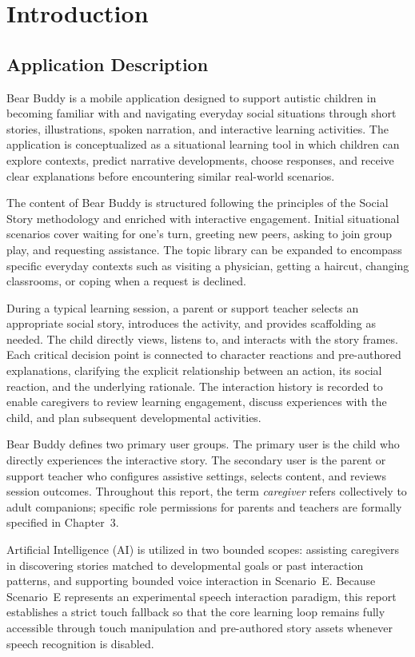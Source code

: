\chapter{Introduction}

\section{Application Description}

Bear Buddy is a mobile application designed to support autistic children in becoming familiar with and navigating everyday social situations through short stories, illustrations, spoken narration, and interactive learning activities. The application is conceptualized as a situational learning tool in which children can explore contexts, predict narrative developments, choose responses, and receive clear explanations before encountering similar real-world scenarios.

The content of Bear Buddy is structured following the principles of the Social Story methodology and enriched with interactive engagement. Initial situational scenarios cover waiting for one's turn, greeting new peers, asking to join group play, and requesting assistance. The topic library can be expanded to encompass specific everyday contexts such as visiting a physician, getting a haircut, changing classrooms, or coping when a request is declined.

During a typical learning session, a parent or support teacher selects an appropriate social story, introduces the activity, and provides scaffolding as needed. The child directly views, listens to, and interacts with the story frames. Each critical decision point is connected to character reactions and pre-authored explanations, clarifying the explicit relationship between an action, its social reaction, and the underlying rationale. The interaction history is recorded to enable caregivers to review learning engagement, discuss experiences with the child, and plan subsequent developmental activities.

Bear Buddy defines two primary user groups. The primary user is the child who directly experiences the interactive story. The secondary user is the parent or support teacher who configures assistive settings, selects content, and reviews session outcomes. Throughout this report, the term \textit{caregiver} refers collectively to adult companions; specific role permissions for parents and teachers are formally specified in Chapter~3.

Artificial Intelligence (AI) is utilized in two bounded scopes: assisting caregivers in discovering stories matched to developmental goals or past interaction patterns, and supporting bounded voice interaction in Scenario~E. Because Scenario~E represents an experimental speech interaction paradigm, this report establishes a strict touch fallback so that the core learning loop remains fully accessible through touch manipulation and pre-authored story assets whenever speech recognition is disabled.

